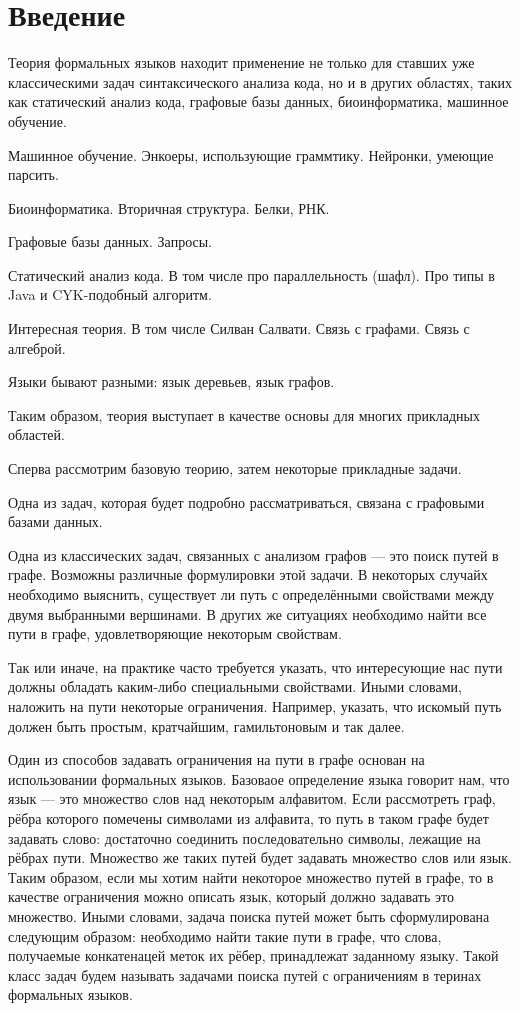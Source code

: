 \chapter*{Введение}

Теория формальных языков находит применение не только для ставших уже классическими задач синтаксического анализа кода, но и в других областях, таких как статический анализ кода, графовые базы данных, биоинформатика, машинное обучение.

Машинное обучение. Энкоеры, использующие граммтику. Нейронки, умеющие парсить.

Биоинформатика. Вторичная структура. Белки, РНК.

Графовые базы данных. Запросы.

Статический анализ кода.
В том числе про параллельность (шафл). Про типы в Java и CYK-подобный алгоритм.


Интересная теория.
В том числе Силван Салвати. Связь с графами. Связь с алгеброй.

Языки бывают разными: язык деревьев, язык графов.

Таким образом, теория выступает в качестве основы для многих прикладных областей.

Сперва рассмотрим базовую теорию, затем некоторые прикладные задачи.


Одна из задач, которая будет подробно рассматриваться, связана с графовыми базами данных.

Одна из классических задач, связанных с анализом графов --- это поиск путей в графе.
Возможны различные формулировки этой задачи.
В некоторых случайх необходимо выяснить, существует ли путь с определёнными свойствами между двумя выбранными вершинами.
В других же ситуациях необходимо найти все пути в графе, удовлетворяющие некоторым свойствам.

Так или иначе, на практике часто требуется указать, что интересующие нас пути должны обладать каким-либо специальными свойствами.
Иными словами, наложить на пути некоторые ограничения.
Например, указать, что искомый путь должен быть простым, кратчайшим, гамильтоновым и так далее.

Один из способов задавать ограничения на пути в графе основан на использовании формальных языков.
Базоваое определение языка говорит нам, что язык --- это множество слов над некоторым алфавитом.
Если рассмотреть граф, рёбра которого помечены символами из алфавита, то путь в таком графе будет задавать слово: достаточно соединить последовательно символы, лежащие на рёбрах пути.
Множество же таких путей будет задавать множество слов или язык.
Таким образом, если мы хотим найти некоторое множество путей в графе, то в качестве ограничения можно описать язык, который должно задавать это множество.
Иными словами, задача поиска путей может быть сформулирована следующим образом: необходимо найти такие пути в графе, что слова, получаемые конкатенацей меток их рёбер, принадлежат заданному языку.
Такой класс задач будем называть задачами поиска путей с ограничениям в теринах формальных языков.

